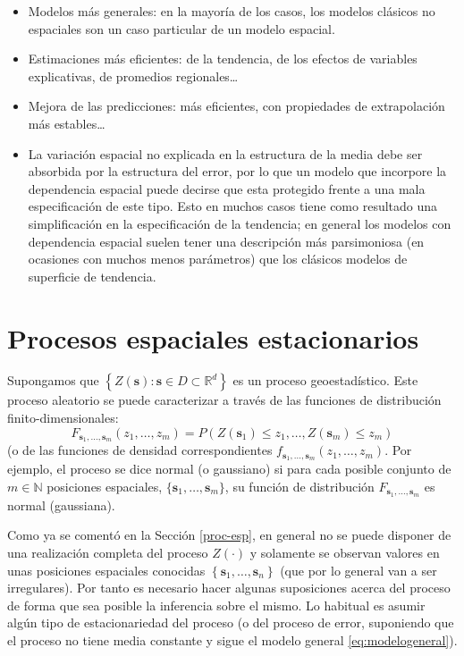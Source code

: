 \documentclass[
  spanish,
]{book}
\theoremstyle{break}
\begin{document}
\begin{itemize}
\item
  Modelos más generales: en la mayoría de los casos, los modelos clásicos no espaciales son un caso particular de un modelo espacial.
\item
  Estimaciones más eficientes: de la tendencia, de los efectos de variables explicativas, de promedios regionales\ldots{}
\item
  Mejora de las predicciones: más eficientes, con propiedades de extrapolación más estables\ldots{}
\item
  La variación espacial no explicada en la estructura de la media debe ser absorbida por la estructura del error, por lo que un modelo que incorpore la dependencia espacial puede decirse que esta protegido frente a una mala especificación de este tipo. Esto en muchos casos tiene como resultado una simplificación en la especificación de la tendencia; en general los modelos con dependencia espacial suelen tener una descripción más parsimoniosa (en ocasiones con muchos menos parámetros) que los clásicos modelos de superficie de tendencia.
\end{itemize}

\hypertarget{procesos-estacionarios}{%
\section{Procesos espaciales estacionarios}\label{procesos-estacionarios}}

Supongamos que \(\left\{ Z(\mathbf{s}) : \mathbf{s} \in D \subset \mathbb{R}^{d} \right\}\) es un proceso geoestadístico.
Este proceso aleatorio se puede caracterizar a través de las funciones de distribución finito-dimensionales:
\[F_{\mathbf{s}_1, \ldots, \mathbf{s}_m}(z_1, \ldots, z_m)
= P\left(Z(\mathbf{s}_1)\leq z_1 , \ldots,Z(\mathbf{s}_m)\leq z_m \right)\]
(o de las funciones de densidad correspondientes \(f_{\mathbf{s}_1, \ldots, \mathbf{s}_m}(z_1, \ldots, z_m)\).
Por ejemplo, el proceso se dice normal (o gaussiano) si para cada posible conjunto de \(m \in \mathbb{N}\) posiciones espaciales, \(\{\mathbf{s}_1, \ldots, \mathbf{s}_m\}\), su función de distribución \(F_{\mathbf{s}_1, \ldots, \mathbf{s}_m}\) es normal (gaussiana).

Como ya se comentó en la Sección \ref{proc-esp}, en general no se puede disponer de una realización completa del proceso \(Z(\cdot)\) y solamente se observan valores en unas posiciones espaciales conocidas \(\left\{ \mathbf{s}_1, \ldots, \mathbf{s}_{n} \right\}\) (que por lo general van a ser irregulares).
Por tanto es necesario hacer algunas suposiciones acerca del proceso de forma que sea posible la inferencia sobre el mismo.
Lo habitual es asumir algún tipo de estacionariedad del proceso (o del proceso de error, suponiendo que el proceso no tiene media constante y sigue el modelo general \eqref{eq:modelogeneral}).
\end{document}
